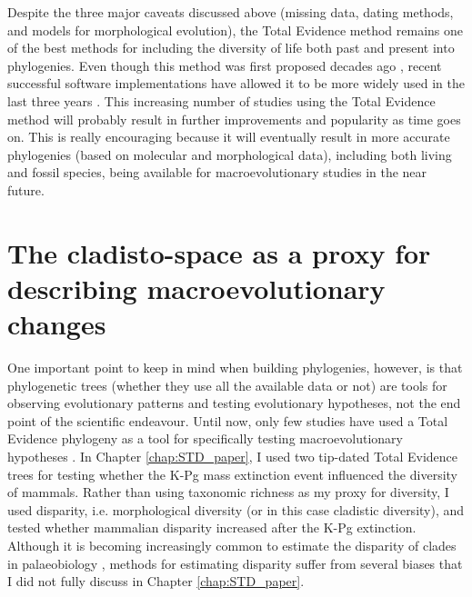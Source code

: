Despite the three major caveats discussed above (missing data, dating methods, and models for morphological evolution), the Total Evidence method remains one of the best methods for including the diversity of life both past and present into phylogenies.
Even though this method was first proposed decades ago \citep[e.g.][]{eernissetaxonomic1993}, recent successful software implementations \citep{Ronquist2012mrbayes,BEAST2} have allowed it to be more widely used in the last three years \citep{ronquista2012,Slater2012MEE,Wood01032013,schragocombining2013,beckancient2014,Arcila2015131,Dembo2015,Klopfstein12082015,Carrizo,Wittenberg2015TEM,gavryushkina2015bayesian}.
This increasing number of studies using the Total Evidence method will probably result in further improvements and popularity as time goes on.
This is really encouraging because it will eventually result in more accurate phylogenies (based on molecular and morphological data), including both living and fossil species, being available for macroevolutionary studies in the near future. 


\section{The cladisto-space as a proxy for describing macroevolutionary changes} 
One important point to keep in mind when building phylogenies, however, is that phylogenetic trees (whether they use all the available data or not) are tools for observing evolutionary patterns and testing evolutionary hypotheses, not the end point of the scientific endeavour.
Until now, only few studies have used a Total Evidence phylogeny as a tool for specifically testing macroevolutionary hypotheses \citep[e.g.][]{Slater2012MEE,Wood01032013,Dembo2015}.
In Chapter \ref{chap:STD_paper}, I used two tip-dated Total Evidence trees for testing whether the K-Pg mass extinction event influenced the diversity of mammals.
Rather than using taxonomic richness as my proxy for diversity, I used disparity, i.e. morphological diversity (or in this case cladistic diversity), and tested whether mammalian disparity increased after the K-Pg extinction.
Although it is becoming increasingly common to estimate the disparity of clades in palaeobiology \citep[e.g.][]{Butler2012,brusattedinosaur2012,toljagictriassic-jurassic2013,brusattegradual2014,bensonfaunal2014,Claddis,Close2015}, methods for estimating disparity suffer from several biases that I did not fully discuss in Chapter \ref{chap:STD_paper}.

